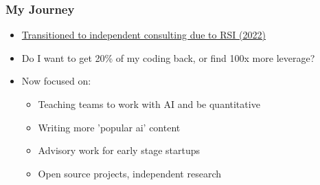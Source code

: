 {    \begin{frame}
        \frametitle{My Journey}
        \begin{itemize}
            \item \textcolor{blue}{\href{https://jxnl.co/writing/2024/04/29/losing-my-hands/}{Transitioned to independent consulting due to RSI (2022)}}
                \item Do I want to get 20\% of my coding back, or find 100x more leverage?
            \item Now focused on:
            \begin{itemize}
                \item Teaching teams to work with AI and be quantitative
                \item Writing more 'popular ai' content
                \item Advisory work for early stage startups
                \item Open source projects, independent research
            \end{itemize}
        \end{itemize}
    \end{frame}

}
